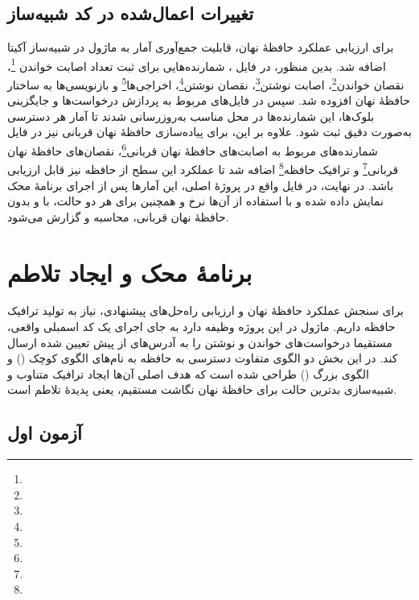 \subsection{تغییرات اعمال‌شده در کد شبیه‌ساز}
برای ارزیابی عملکرد حافظهٔ نهان، قابلیت جمع‌آوری آمار به ماژول  در شبیه‌ساز آکیتا اضافه شد. بدین منظور، در فایل ، شمارنده‌هایی برای ثبت تعداد اصابت خواندن \footnote{}، 
نقصان خواندن\footnote{}، 
اصابت نوشتن\footnote{}، 
نقصان نوشتن\footnote{}، 
اخراجی‌ها\footnote{} و 
بازنویسی‌ها به ساختار حافظهٔ نهان افزوده شد. سپس در فایل‌های مربوط به پردازش درخواست‌ها و جایگزینی بلوک‌ها، این شمارنده‌ها در محل مناسب به‌روزرسانی شدند تا آمار هر دسترسی به‌صورت دقیق ثبت شود. علاوه بر این، برای پیاده‌سازی حافظهٔ نهان قربانی نیز در فایل  شمارنده‌های مربوط به اصابت‌های حافظهٔ نهان قربانی\footnote{}،
 نقصان‌های حافظهٔ نهان قربانی\footnote{}
  و ترافیک حافظه\footnote{} 
اضافه شد تا عملکرد این سطح از حافظه نیز قابل ارزیابی باشد. در نهایت، در فایل  واقع در پروژهٔ اصلی، این آمارها پس از اجرای برنامهٔ محک نمایش داده شده و با استفاده از آن‌ها نرخ  و همچنین  برای هر دو حالت، با و بدون حافظهٔ نهان قربانی، محاسبه و گزارش می‌شود.

\section{برنامهٔ محک و ایجاد تلاطم}

برای سنجش عملکرد حافظهٔ نهان و ارزیابی راه‌حل‌های پیشنهادی، نیاز به تولید ترافیک حافظه داریم. ماژول  در این پروژه وظیفه دارد به جای اجرای یک کد اسمبلی واقعی، مستقیما درخواست‌های خواندن و نوشتن را به آدرس‌های از پیش تعیین شده ارسال کند. در این بخش دو الگوی متفاوت دسترسی به حافظه به نام‌های الگوی کوچک () و الگوی بزرگ () طراحی شده است که هدف اصلی آن‌ها ایجاد ترافیک متناوب و شبیه‌سازی بدترین حالت برای حافظهٔ نهان نگاشت مستقیم، یعنی پدیدهٔ تلاطم است.

\subsection{آزمون اول}


